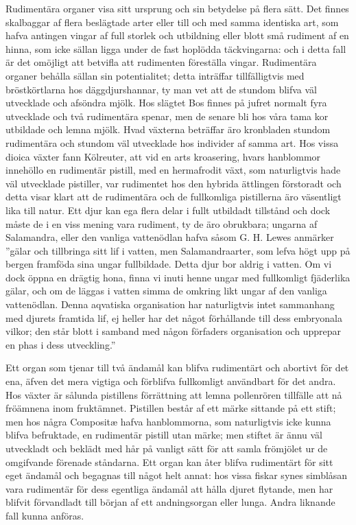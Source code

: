 Rudimentära organer visa sitt ursprung och sin betydelse på flera sätt. Det finnes skalbaggar af flera beslägtade arter eller till och med samma identiska art, som hafva antingen vingar af full storlek och utbildning eller blott små rudiment af en hinna, som icke sällan ligga under de fast hoplödda täckvingarna: och i detta fall är det omöjligt att betvifla att rudimenten föreställa vingar. Rudimentära organer behålla sällan sin potentialitet; detta inträffar tillfälligtvis med bröstkörtlarna hos däggdjurshannar, ty man vet att de stundom blifva väl utvecklade och afsöndra mjölk. Hos slägtet Bos finnes på jufret normalt fyra utvecklade och två rudimentära spenar, men de senare bli hos våra tama kor utbildade och lemna mjölk. Hvad växterna beträffar äro kronbladen stundom rudimentära och stundom väl utvecklade hos individer af samma art. Hos vissa dioica växter fann Kölreuter, att vid en arts kroasering, hvars hanblommor innehöllo en rudimentär pistill, med en hermafrodit växt, som naturligtvis hade väl utvecklade pistiller, var rudimentet hos den hybrida ättlingen förstoradt och detta visar klart att de rudimentära och de fullkomliga pistillerna äro väsentligt lika till natur. Ett djur kan ega flera delar i fullt utbildadt tillstånd och dock måste de i en viss mening vara rudiment, ty de äro obrukbara; ungarna af Salamandra, eller den vanliga vattenödlan hafva såsom G. H. Lewes anmärker ”gälar och tillbringa sitt lif i vatten, men Salamandraarter, som lefva högt upp på bergen framföda sina ungar fullbildade. Detta djur bor aldrig i vatten. Om vi dock öppna en drägtig hona, finna vi inuti henne ungar med fullkomligt fjäderlika gälar, och om de läggas i vatten simma de omkring likt ungar af den vanliga vattenödlan. Denna aqvatiska organisation har naturligtvis intet sammanhang med djurets framtida lif, ej heller har det något förhållande till dess embryonala vilkor; den står blott i samband med någon förfaders organisation och upprepar en phas i dess utveckling.”

Ett organ som tjenar till två ändamål kan blifva rudimentärt och abortivt för det ena, äfven det mera vigtiga och förblifva fullkomligt användbart för det andra. Hos växter är sålunda pistillens förrättning att lemna pollenrören tillfälle att nå fröämnena inom fruktämnet. Pistillen består af ett märke sittande på ett stift; men hos några Compositæ hafva hanblommorna, som naturligtvis icke kunna blifva befruktade, en rudimentär pistill utan märke; men stiftet är ännu väl utveckladt och beklädt med hår på vanligt sätt för att samla frömjölet ur de omgifvande förenade ståndarna. Ett organ kan åter blifva rudimentärt för sitt eget ändamål och begagnas till något helt annat: hos vissa fiskar synes simblåsan vara rudimentär för dess egentliga ändamål att hålla djuret flytande, men har blifvit förvandladt till början af ett andningsorgan eller lunga. Andra liknande fall kunna anföras.

